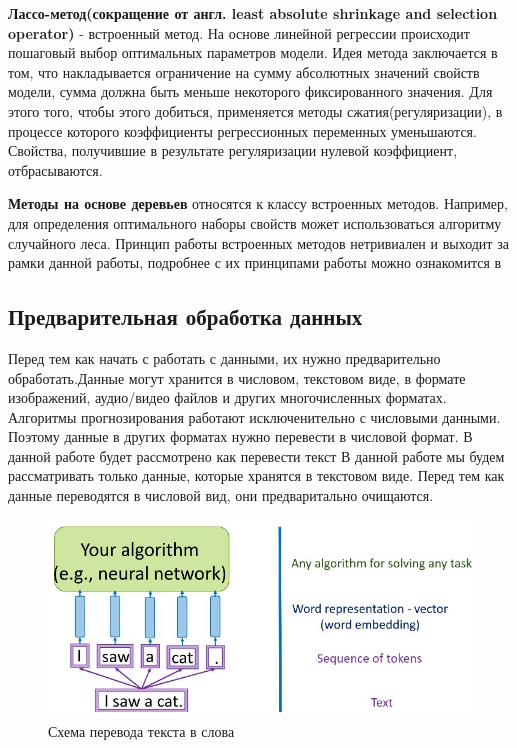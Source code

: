 \textbf{Лассо-метод(сокращение от англ. least absolute shrinkage and selection operator)} - встроенный метод. На основе линейной регрессии происходит пошаговый выбор оптимальных параметров модели.  Идея метода заключается в том, что накладывается ограничение на сумму абсолютных значений свойств модели, сумма должна быть меньше некоторого фиксированного значения. Для этого того, чтобы этого добиться, применяется методы сжатия(регуляризации), в процессе которого коэффициенты регрессионных переменных уменьшаются. Свойства, получившие в результате регуляризации нулевой коэффициент, отбрасываются.

\textbf{Методы на основе деревьев} относятся к классу встроенных методов. Например, для определения оптимального наборы свойств может использоваться алгоритму случайного леса. Принцип работы встроенных методов нетривиален и выходит за рамки данной работы, подробнее с их принципами работы можно ознакомится в \cite{Book15}
\subsection{Предварительная обработка данных}

Перед тем как начать с работать с данными, их нужно предварительно обработать.Данные могут хранится в числовом, текстовом виде, в формате изображений, аудио/видео файлов и других многочисленных форматах. Алгоритмы прогнозирования работают исключенительно с числовыми данными. Поэтому данные в других форматах нужно перевести в числовой формат. В данной работе будет рассмотрено как перевести текст В данной работе мы будем рассматривать только данные, которые хранятся в текстовом виде. 
Перед тем как данные переводятся в числовой вид, они предваритально очищаются. 


\begin{figure}[!h]
	\centering
	\includegraphics[width=.5\textwidth]{master_img/learning-word-representations.jpg}
	\caption{Схема перевода текста в слова}
	\label{fig01_master}
\end{figure}

